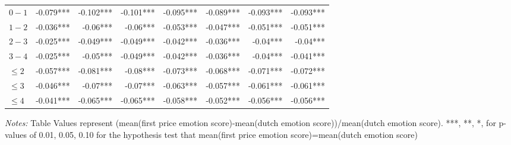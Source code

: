 \documentclass[]{article}
\begin{document}
\begin{table}[!htb]
\begin{tabular}{lrrrrrrr}
\cmidrule(lr){1-1} \cmidrule(lr){2-8}
$0-1$ & -0.079*** & -0.102*** & -0.101*** & -0.095*** & -0.089*** & -0.093*** & -0.093*** \\ 
  $1-2$ & -0.036*** & -0.06***  & -0.06***  & -0.053*** & -0.047*** & -0.051*** & -0.051*** \\ 
  $2-3$ & -0.025*** & -0.049*** & -0.049*** & -0.042*** & -0.036*** & -0.04***  & -0.04***  \\ 
  $3-4$ & -0.025*** & -0.05***  & -0.049*** & -0.042*** & -0.036*** & -0.04***  & -0.041*** \\ 
$\leq 2$ & -0.057*** & -0.081*** & -0.08***  & -0.073*** & -0.068*** & -0.071*** & -0.072*** \\ 
$\leq 3$ & -0.046*** & -0.07***  & -0.07***  & -0.063*** & -0.057*** & -0.061*** & -0.061*** \\ 
$\leq 4$ & -0.041*** & -0.065*** & -0.065*** & -0.058*** & -0.052*** & -0.056*** & -0.056*** \\ 
\bottomrule 

\end{tabular} 

\begin{minipage}{\textwidth}
\footnotesize
\vspace{0.25cm}
\emph{Notes:} Table Values represent  (mean(first price emotion score)-mean(dutch emotion score))/mean(dutch emotion score). ***, **, *, for p-values of 0.01, 0.05, 0.10 for the hypothesis test that mean(first price emotion score)=mean(dutch emotion score)
\end{minipage}
\endgroup
\end{table}
\end{document}
